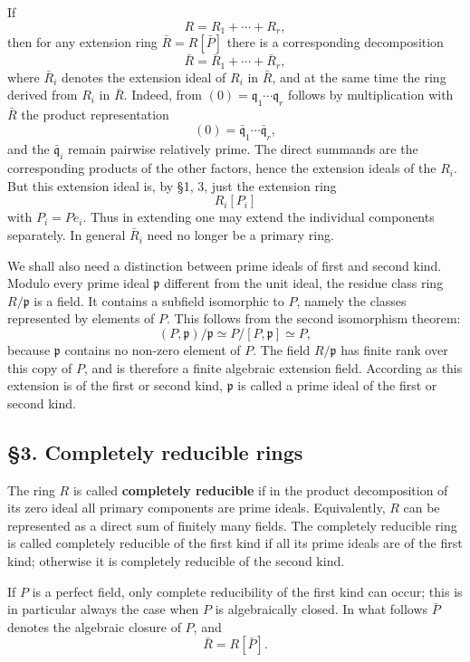 \documentclass[
  12pt,
]{article}
\begin{document}
If \[
  R=R_1+
\cdots+R_r,
\] then for any extension ring \(\bar R=R[\bar P]\) there is a
corresponding decomposition \[
  \bar R=\bar R_1+
\cdots+\bar R_r,
\] where \(\bar R_i\) denotes the extension ideal of \(R_i\) in
\(\bar R\), and at the same time the ring derived from \(R_i\) in
\(\bar R\). Indeed, from \((0)=\mathfrak q_1\cdots\mathfrak q_r\)
follows by multiplication with \(\bar R\) the product representation \[
  (0)=\bar{\mathfrak q}_1\cdots\bar{\mathfrak q}_r,
\] and the \(\bar{\mathfrak q}_i\) remain pairwise relatively prime. The
direct summands are the corresponding products of the other factors,
hence the extension ideals of the \(R_i\). But this extension ideal is,
by §1, 3, just the extension ring \[
  R_i[P_i]
\] with \(P_i=Pe_i\). Thus in extending one may extend the individual
components separately. In general \(\bar R_i\) need no longer be a
primary ring.

We shall also need a distinction between prime ideals of first and
second kind. Modulo every prime ideal \(\mathfrak p\) different from the
unit ideal, the residue class ring \(R/\mathfrak p\) is a field. It
contains a subfield isomorphic to \(P\), namely the classes represented
by elements of \(P\). This follows from the second isomorphism theorem:
\[
  (P,\mathfrak p)/\mathfrak p \simeq P/[P,\mathfrak p]\simeq P,
\] because \(\mathfrak p\) contains no non-zero element of \(P\). The
field \(R/\mathfrak p\) has finite rank over this copy of \(P\), and is
therefore a finite algebraic extension field. According as this
extension is of the first or second kind, \(\mathfrak p\) is called a
prime ideal of the first or second kind.

\subsection{§3. Completely reducible
rings}\label{completely-reducible-rings}

The ring \(R\) is called \textbf{completely reducible} if in the product
decomposition of its zero ideal all primary components are prime ideals.
Equivalently, \(R\) can be represented as a direct sum of finitely many
fields. The completely reducible ring is called completely reducible of
the first kind if all its prime ideals are of the first kind; otherwise
it is completely reducible of the second kind.

If \(P\) is a perfect field, only complete reducibility of the first
kind can occur; this is in particular always the case when \(P\) is
algebraically closed. In what follows \(\bar P\) denotes the algebraic
closure of \(P\), and \[
  \bar R=R[\bar P].
\]
\end{document}
